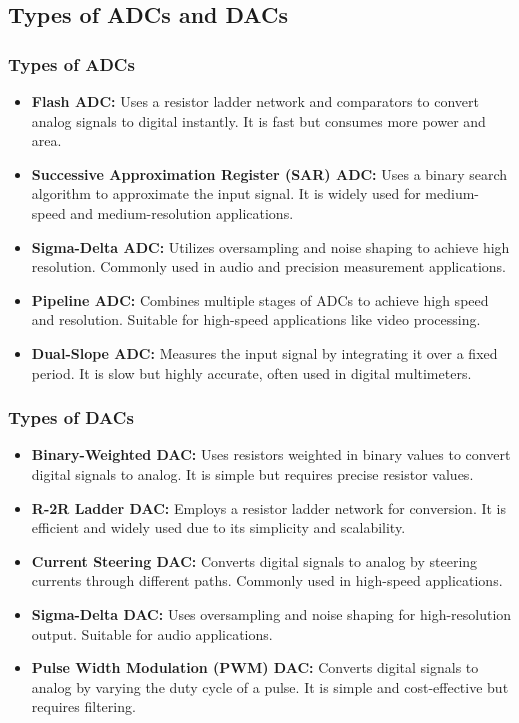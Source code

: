 \subsection{Types of ADCs and DACs}
\subsubsection{Types of ADCs}
\begin{itemize}
    \item \textbf{Flash ADC:} Uses a resistor ladder network and comparators to convert analog signals to digital instantly. It is fast but consumes more power and area.
    \item \textbf{Successive Approximation Register (SAR) ADC:} Uses a binary search algorithm to approximate the input signal. It is widely used for medium-speed and medium-resolution applications.
    \item \textbf{Sigma-Delta ADC:} Utilizes oversampling and noise shaping to achieve high resolution. Commonly used in audio and precision measurement applications.
    \item \textbf{Pipeline ADC:} Combines multiple stages of ADCs to achieve high speed and resolution. Suitable for high-speed applications like video processing.
    \item \textbf{Dual-Slope ADC:} Measures the input signal by integrating it over a fixed period. It is slow but highly accurate, often used in digital multimeters.
\end{itemize}

\subsubsection{Types of DACs}
\begin{itemize}
    \item \textbf{Binary-Weighted DAC:} Uses resistors weighted in binary values to convert digital signals to analog. It is simple but requires precise resistor values.
    \item \textbf{R-2R Ladder DAC:} Employs a resistor ladder network for conversion. It is efficient and widely used due to its simplicity and scalability.
    \item \textbf{Current Steering DAC:} Converts digital signals to analog by steering currents through different paths. Commonly used in high-speed applications.
    \item \textbf{Sigma-Delta DAC:} Uses oversampling and noise shaping for high-resolution output. Suitable for audio applications.
    \item \textbf{Pulse Width Modulation (PWM) DAC:} Converts digital signals to analog by varying the duty cycle of a pulse. It is simple and cost-effective but requires filtering.
\end{itemize}

